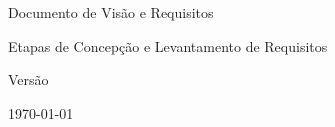 \begin{titlepage}
  \centering
  \vspace*{4cm}
  {\Huge\bfseries \nomeapp \par}
  \vspace{1cm}
  {\Large Documento de Visão e Requisitos \par}
  \vspace{0.5cm}
  {\large Etapas de Concepção e Levantamento de Requisitos \par}
  \vfill
  {\large \autor \par}
  \vspace{0.5cm}
  {\large Versão \versaodoc \par}
  {\large \today \par}
\end{titlepage}
